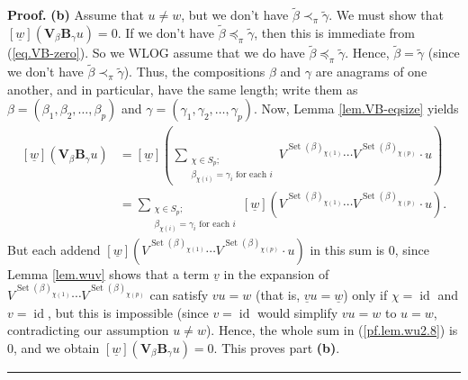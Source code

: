 \documentclass[submission]{FPSAC2026}
\newcommand{\id}{\operatorname{id}} %
\newenvironment{proof}[1][Proof]{\noindent\textbf{#1.} }{\ \rule{0.5em}{0.5em}}
\begin{document}
\begin{proof}
\textbf{(b)} Assume that $u\neq w$, but we don't have $\widetilde{\beta}%
\prec_{\pi}\widetilde{\gamma}$. We must show that $[\underline w]\left(  \mathbf{V}%
_{\beta}\mathbf{B}_{\gamma}u\right)  =0$. If we don't have $\widetilde{\beta
}\preceq_{\pi}\widetilde{\gamma}$, then this is immediate from
(\ref{eq.VB-zero}). So we WLOG assume that we do have $\widetilde{\beta}\preceq_{\pi
}\widetilde{\gamma}$. Hence, $\widetilde{\beta}=\widetilde{\gamma}$ (since we
don't have  $\widetilde{\beta}\prec_{\pi}\widetilde{\gamma}$). Thus, the
compositions $\beta$ and $\gamma$ are anagrams of one another, and in
particular, have the same length; write them as $\beta=\left(  \beta_{1}%
,\beta_{2},\ldots,\beta_{p}\right)  $ and $\gamma=\left(  \gamma_{1}%
,\gamma_{2},\ldots,\gamma_{p}\right)  $. Now, Lemma \ref{lem.VB-eqsize} yields%
\begin{align}
\left[  \underline w\right]  \left(  \mathbf{V}_{\beta}\mathbf{B}_{\gamma}u\right)    &
=\left[  \underline w\right]  \left(  \sum_{\substack{\chi\in S_{p};\\\beta_{\chi\left(
i\right)  }=\gamma_{i}\text{ for each }i}}
V^{\operatorname{Set}(\beta)_{\chi(1)}}\cdots
V^{\operatorname{Set}(\beta)_{\chi(p)}}\cdot u\right)  \nonumber\\
& =\sum_{\substack{\chi\in S_{p};\\\beta_{\chi\left(  i\right)  }=\gamma
_{i}\text{ for each }i}}\left[  \underline w\right]  \left( 
V^{\operatorname{Set}(\beta)_{\chi(1)}}\cdots 
V^{\operatorname{Set}(\beta)_{\chi(p)}}\cdot u\right)  .
\label{pf.lem.wu2.8}%
\end{align}
But each addend $\left[ \underline w\right]  \left( 
V^{\operatorname{Set}(\beta)_{\chi(1)}}\cdots
V^{\operatorname{Set}(\beta)_{\chi(p)}}\cdot u\right)  $ in this sum is $0$,
since Lemma \ref{lem.wuv} shows that a term $\underline v$ in the expansion of
$V^{\operatorname{Set}(\beta)_{\chi(1)}}\cdots
V^{\operatorname{Set}(\beta)_{\chi(p)}}$ can satisfy $vu=w$
(that is, $\underline v u = \underline w$)
only if
$\chi= \id $ and $v= \id $, but this is impossible
(since $v= \id $ would simplify $vu=w$ to $u=w$, contradicting
our assumption $u\neq w$). Hence, the whole sum in (\ref{pf.lem.wu2.8}) is
$0$, and we obtain $\left[  \underline w\right]  \left(  \mathbf{V}_{\beta}%
\mathbf{B}_{\gamma}u\right)  =0$. This proves part \textbf{(b)}.
\end{proof}
\end{document}
